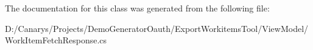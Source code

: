 The documentation for this class was generated from the following file\+:\begin{DoxyCompactItemize}
\item 
D\+:/\+Canarys/\+Projects/\+Demo\+Generator\+Oauth/\+Export\+Workitems\+Tool/\+View\+Model/Work\+Item\+Fetch\+Response.\+cs\end{DoxyCompactItemize}
